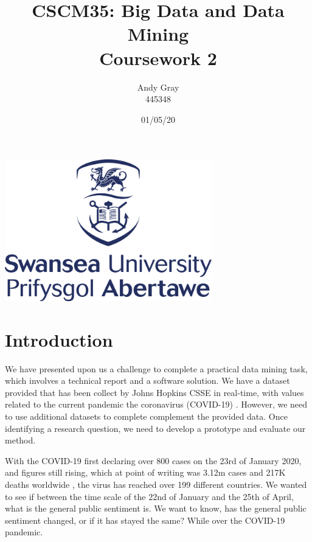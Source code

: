 \documentclass[a4paper,10pt]{article}
\begin{document}
	
	\title{\textbf{CSCM35: Big Data and Data Mining \\Coursework 2}}
	\date{01/05/20}
	\author{Andy Gray\\445348}
	
	\maketitle
	\begin{center}
		\item\includegraphics[width=9cm]{swansea.png}
	\end{center}
	
	\thispagestyle{empty}
	\newpage
	
	\section{Introduction}
	
	We have presented upon us a challenge to complete a practical data mining task, which involves a technical report and a software solution. We have a dataset provided that has been collect by Johns Hopkins CSSE in real-time, with values related to the current pandemic the coronavirus (COVID-19) \cite{jhmcdata}. However, we need to use additional datasets to complete complement the provided data. Once identifying a research question, we need to develop a prototype and evaluate our method. 
	
	With the COVID-19 first declaring over 800 cases on the 23rd of January 2020, and figures still rising, which at point of writing was 3.12m cases and 217K deaths worldwide \cite{worldmeter}, the virus has reached over 199 different countries. We wanted to see if between the time scale of the 22nd of January and the 25th of April, what is the general public sentiment is. We want to know, has the general public sentiment changed, or if it has stayed the same? While over the COVID-19 pandemic.
	
\end{document}
